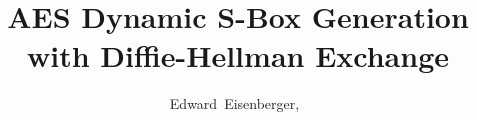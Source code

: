 \documentclass[journal]{IEEEtran}
\begin{document}
\title{AES Dynamic S-Box Generation\\with Diffie-Hellman Exchange}


\author{Edward~Eisenberger,~	
}

% 
%





\end{document}
